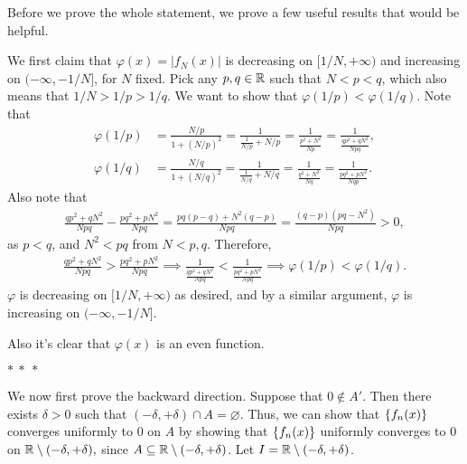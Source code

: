 \documentclass[12pt]{article}
\begin{document}
\begin{fproof}[1(b)]
    Before we prove the whole statement, we prove a few useful results that would be helpful.

    We first claim that \(\varphi(x) = |f_N(x)|\) is decreasing on \([1/N, +\infty)\) and increasing on \((-\infty, -1/N]\), for \(N\) fixed.
    Pick any \(p,q \in \mathbb {R}\) such that \(N < p < q\), which also means that \(1/N > 1/p > 1/q\).
    We want to show that \(\varphi(1/p) < \varphi(1/q)\).
    Note that
    \begin{align*}
        \varphi(1/p) &= \frac{N/p}{1 + (N/p)^2} = \frac{1}{\frac{1}{N/p} + N/p} = \frac{1}{\frac{p^2+N^2}{Np}} = \frac{1}{\frac{qp^2+qN^2}{Npq}},\\
        \varphi(1/q) &=\frac{N/q}{1 + (N/q)^2} = \frac{1}{\frac{1}{N/q} + N/q} = \frac{1}{\frac{q^2 + N^2}{Nq}} = \frac{1}{\frac{pq^2 + pN^2}{Nqp}}.
    \end{align*}
    Also note that
    \begin{align*}
        \frac{qp^2 + qN^2}{Npq} - \frac{pq^2 + pN^2}{Npq} = \frac{pq(p-q) + N^2(q-p)}{Npq} = \frac{(q-p)(pq - N^2)}{Npq} > 0,
    \end{align*}
    as \(p < q\), and \(N^2 < pq\) from \(N<p,q\).
    Therefore, 
    \begin{align*}
        \frac{qp^2 + qN^2}{Npq} > \frac{pq^2 + pN^2}{Npq} \implies \frac{1}{\frac{qp^2 + qN^2}{Npq}} < \frac{1}{\frac{pq^2 + pN^2}{Npq}} \implies \varphi(1/p) < \varphi(1/q).
    \end{align*}
    \(\varphi\) is decreasing on \([1/N, +\infty)\) as desired, and by a similar argument, \(\varphi\) is increasing on \((-\infty, -1/N]\).

    Also it's clear that \(\varphi(x)\) is an even function.


    \begin{center}
        \(\ast~\ast~\ast\)
    \end{center}

    We now first prove the backward direction.
    Suppose that \(0 \notin A'\).
    Then there exists \(\delta>0\) such that \((-\delta, +\delta) \cap A = \varnothing.\)
    Thus, we can show that \(\left\{ f_n(x) \right\}\) converges uniformly to 0 on \(A\) by showing that \(\left\{ f_n(x) \right\}\) uniformly converges to \(0\) on \(\mathbb {R} \setminus (-\delta, +\delta),\) since \(A \subseteq \mathbb {R} \setminus (-\delta, +\delta)\).
    Let \(I = \mathbb {R} \setminus (-\delta, +\delta)\).


\end{fproof}
\end{document}
